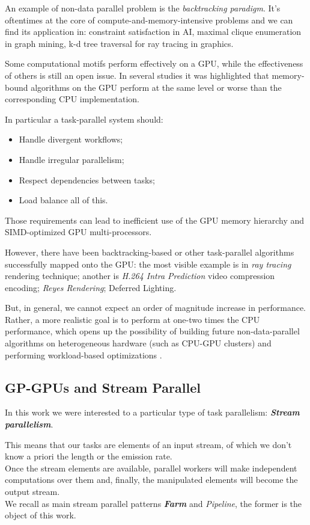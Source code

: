 	An example of non-data parallel problem is the \textit{backtracking paradigm}.
	It's oftentimes at the core of compute-and-memory-intensive problems and we can find its application in: constraint satisfaction in AI, maximal clique enumeration in graph mining, k-d tree traversal for ray tracing in graphics.
	
	Some computational motifs perform effectively on a GPU, while the effectiveness of others is still an open issue. 		
	In several studies it was highlighted that memory-bound algorithms on the GPU perform at the same level or worse than the corresponding CPU implementation. 
	
	In particular a task-parallel system should:
	\begin{itemize}
		\item Handle divergent workflows;
		\item Handle irregular parallelism;
		\item Respect dependencies between tasks;
		\item Load balance all of this.
	\end{itemize}
	
	Those requirements can lead to inefficient use of the GPU memory hierarchy and SIMD-optimized GPU multi-processors.
	
	However, there have been backtracking-based or other task-parallel algorithms successfully mapped onto the GPU: the most visible example is in \textit{ray tracing} rendering technique; another is \textit{H.264 Intra Prediction} video compression encoding; \textit{Reyes Rendering}; Deferred Lighting.
		
	But, in general, we	cannot expect an order of magnitude increase in performance. Rather, a more realistic goal is to perform at one-two times the CPU performance, which opens up the possibility of building future non-data-parallel algorithms on heterogeneous hardware (such as CPU-GPU clusters) and performing workload-based optimizations	\cite{backtrack}.
 

\subsection{GP-GPUs and Stream Parallel}
	In this work we were interested to a particular type of task parallelism:
	\textbf{\textit{Stream parallelism}}.
	
	This means that our tasks are elements of an input stream, of which we don't know a priori the length or the emission rate.\\
	Once the stream elements are available, parallel workers will make independent computations over them and, finally, the manipulated elements will become the output stream.\\
	We recall as main stream parallel patterns \textbf{\textit{Farm}} and \textit{Pipeline}, the former is the object of this work.\\
	
